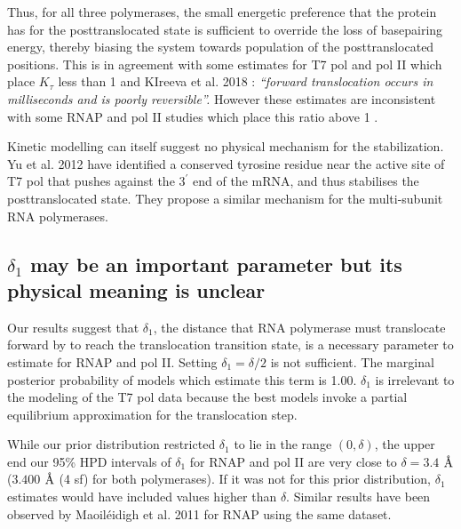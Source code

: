 \documentclass[10pt,letterpaper]{article}
\newcommand{\angstrom}{\mbox{\normalfont\AA}}
\begin{document}
Thus, for all three polymerases, the small energetic preference that the protein has for the posttranslocated state is sufficient to override the loss of basepairing energy, thereby biasing the system towards population of the posttranslocated positions. This is in agreement with some estimates for T7 pol and pol II which place $K_\tau$ less than 1 \cite{larson2012trigger, schweikhard2014transcription, thomen2008t7,yin2004structural, yu2012small} and KIreeva et al. 2018 \cite{kireeva2018rna}: \textit{``forward translocation occurs in milliseconds and is poorly reversible''.} However these estimates are inconsistent with some RNAP and pol II studies which place this ratio above 1  \cite{abbondanzieri2005direct, maoileidigh2011unified, Dangkulwanich2013complete}. 

Kinetic modelling can itself suggest no physical mechanism for the stabilization. Yu et al. 2012 \cite{yu2012small} have identified a conserved tyrosine residue near the active site of T7 pol that pushes against the $3^\prime$ end of the mRNA, and thus stabilises the posttranslocated state. They propose a similar mechanism for the multi-subunit RNA polymerases.  \par




\subsection*{$\delta_1$ may be an important parameter but its physical meaning is unclear} 

Our results suggest that $\delta_1$, the distance that RNA polymerase must translocate forward by to reach the translocation transition state, is a necessary parameter to estimate for RNAP and pol II. Setting $\delta_1 = \delta / 2$ is not sufficient. The marginal posterior probability of models which estimate this term is 1.00. $\delta_1$ is irrelevant to the modeling of the T7 pol data because the best models invoke a partial equilibrium approximation for the translocation step. 




While our prior distribution restricted $\delta_1$ to lie in the range $(0, \delta)$, the upper end our 95\% HPD intervals of $\delta_1$ for RNAP and pol II are very close to $\delta = 3.4$ $\angstrom$ ($3.400$ $\angstrom$ (4 sf) for both polymerases). If it was not for this prior distribution, $\delta_1$ estimates would have included values higher than $\delta$. Similar results have been observed by Maoil{\'e}idigh et al. 2011 \cite{maoileidigh2011unified} for RNAP using the same dataset. \par
\end{document}
